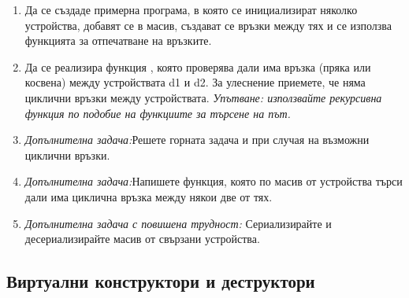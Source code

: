 \begin{enumerate}[resume]
\begin{enumerate}[label=\alph*)]
		\item Да се създаде примерна програма, в която се инициализират няколко устройства, добавят се в масив, създават се връзки между тях и се използва функцията  за отпечатване на връзките.

		\item Да се реализира функция , която проверява дали има връзка (пряка или косвена) между устройствата d1 и d2. За улеснение приемете, че няма циклични връзки между устройствата. \textit{Упътване: използвайте рекурсивна функция по подобие на функциите за търсене на път.}

		\item \textit{Допълнителна задача:}Решете горната задача и при случая на възможни циклични връзки.

		\item \textit{Допълнителна задача:}Напишете функция, която по масив от устройства търси дали има циклична връзка между някои две от тях.

		\item \textit{Допълнителна задача с повишена трудност:} Сериализирайте и десериализирайте масив от свързани устройства.
	\end{enumerate}




\end{enumerate}


\pagebreak

\subsection {Виртуални конструктори и деструктори}

